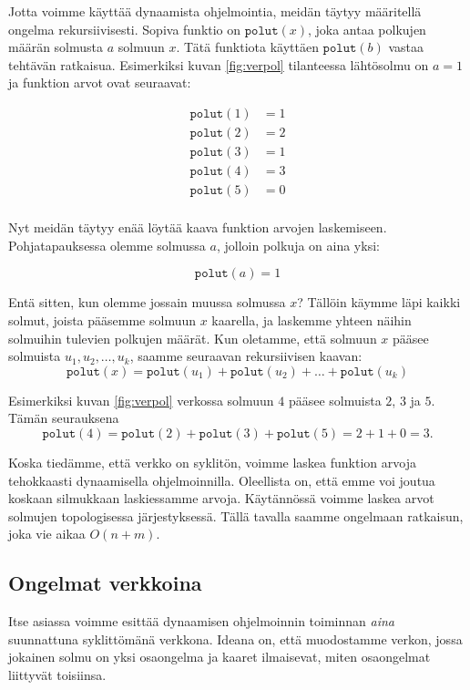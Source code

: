 Jotta voimme käyttää dynaamista ohjelmointia,
meidän täytyy määritellä ongelma rekursiivisesti.
Sopiva funktio on $\texttt{polut}(x)$,
joka antaa polkujen määrän solmusta $a$ solmuun $x$.
Tätä funktiota käyttäen $\texttt{polut}(b)$
vastaa tehtävän ratkaisua.
Esimerkiksi kuvan \ref{fig:verpol} tilanteessa lähtösolmu on $a=1$
ja funktion arvot ovat seuraavat:

\begin{align*}
\texttt{polut}(1)&=1 \\
\texttt{polut}(2)&=2 \\
\texttt{polut}(3)&=1 \\
\texttt{polut}(4)&=3 \\
\texttt{polut}(5)&=0 \\
\end{align*}

Nyt meidän täytyy enää löytää kaava funktion
arvojen laskemiseen.
Pohjatapauksessa olemme solmussa $a$,
jolloin polkuja on aina yksi:

\[ \texttt{polut}(a)=1 \]

Entä sitten, kun olemme jossain muussa solmussa $x$?
Tällöin käymme läpi kaikki solmut, joista pääsemme
solmuun $x$ kaarella, ja laskemme yhteen näihin
solmuihin tulevien polkujen määrät.
Kun oletamme, että solmuun $x$ pääsee solmuista $u_1,u_2,\dots,u_k$,
saamme seuraavan rekursiivisen kaavan:
\[ \texttt{polut}(x)=\texttt{polut}(u_1)+\texttt{polut}(u_2)+\dots+\texttt{polut}(u_k) \]

Esimerkiksi kuvan \ref{fig:verpol} verkossa
solmuun $4$ pääsee solmuista $2$, $3$ ja $5$.
Tämän seurauksena
\[ \texttt{polut}(4)=\texttt{polut}(2)+\texttt{polut}(3)+\texttt{polut}(5) = 2+1+0 = 3.\]

Koska tiedämme, että verkko on syklitön,
voimme laskea funktion arvoja
tehokkaasti dynaamisella ohjelmoinnilla.
Oleellista on, että emme voi joutua koskaan silmukkaan
laskiessamme arvoja.
Käytännössä voimme laskea arvot solmujen
topologisessa järjestyksessä.
Tällä tavalla saamme ongelmaan ratkaisun, joka
vie aikaa $O(n+m)$.

\subsection{Ongelmat verkkoina}

Itse asiassa voimme esittää dynaamisen ohjelmoinnin toiminnan
\emph{aina} suunnattuna syklittömänä verkkona.
Ideana on, että muodostamme verkon, jossa jokainen solmu on
yksi osaongelma ja kaaret ilmaisevat,
miten osaongelmat liittyvät toisiinsa.

